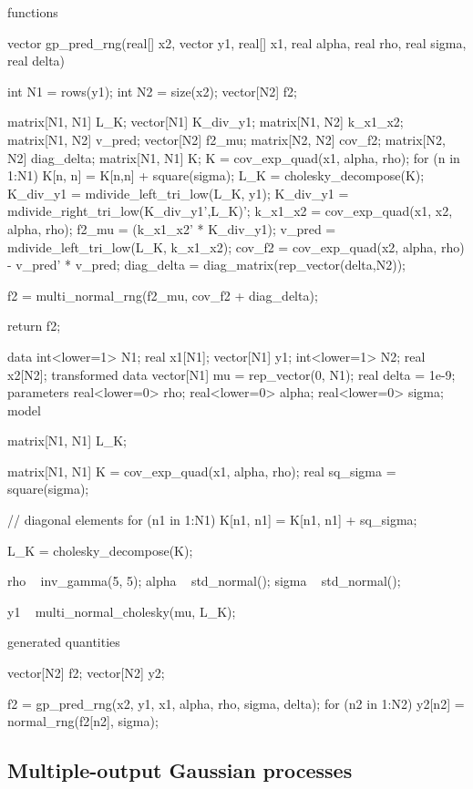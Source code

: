 \begin{stancode}
functions {
  vector gp_pred_rng(real[] x2,
                     vector y1,
                     real[] x1,
                     real alpha,
                     real rho,
                     real sigma,
                     real delta) {
    int N1 = rows(y1);
    int N2 = size(x2);
    vector[N2] f2;
    {
      matrix[N1, N1] L_K;
      vector[N1] K_div_y1;
      matrix[N1, N2] k_x1_x2;
      matrix[N1, N2] v_pred;
      vector[N2] f2_mu;
      matrix[N2, N2] cov_f2;
      matrix[N2, N2] diag_delta;
      matrix[N1, N1] K;
      K = cov_exp_quad(x1, alpha, rho);
      for (n in 1:N1)
        K[n, n] = K[n,n] + square(sigma);
      L_K = cholesky_decompose(K);
      K_div_y1 = mdivide_left_tri_low(L_K, y1);
      K_div_y1 = mdivide_right_tri_low(K_div_y1',L_K)';
      k_x1_x2 = cov_exp_quad(x1, x2, alpha, rho);
      f2_mu = (k_x1_x2' * K_div_y1);
      v_pred = mdivide_left_tri_low(L_K, k_x1_x2);
      cov_f2 = cov_exp_quad(x2, alpha, rho) - v_pred' * v_pred;
      diag_delta = diag_matrix(rep_vector(delta,N2));

      f2 = multi_normal_rng(f2_mu, cov_f2 + diag_delta);
    }
    return f2;
  }
}
data {
  int<lower=1> N1;
  real x1[N1];
  vector[N1] y1;
  int<lower=1> N2;
  real x2[N2];
}
transformed data {
  vector[N1] mu = rep_vector(0, N1);
  real delta = 1e-9;
}
parameters {
  real<lower=0> rho;
  real<lower=0> alpha;
  real<lower=0> sigma;
}
model {
  matrix[N1, N1] L_K;
  {
    matrix[N1, N1] K = cov_exp_quad(x1, alpha, rho);
    real sq_sigma = square(sigma);

    // diagonal elements
    for (n1 in 1:N1)
      K[n1, n1] = K[n1, n1] + sq_sigma;

    L_K = cholesky_decompose(K);
  }

  rho ~ inv_gamma(5, 5);
  alpha ~ std_normal();
  sigma ~ std_normal();

  y1 ~ multi_normal_cholesky(mu, L_K);
}
generated quantities {
  vector[N2] f2;
  vector[N2] y2;

  f2 = gp_pred_rng(x2, y1, x1, alpha, rho, sigma, delta);
  for (n2 in 1:N2)
    y2[n2] = normal_rng(f2[n2], sigma);
}
\end{stancode}

\subsection{Multiple-output Gaussian processes}


